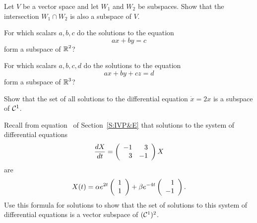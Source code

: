 \documentclass{ximera}
\begin{document}
\begin{exercise} \label{c5.1.6}
Let $V$ be a vector space and let $W_1$ and $W_2$ be subspaces.
Show that the intersection $W_1\cap W_2$ is also a subspace of $V$.
\end{exercise}

\begin{exercise} \label{c5.1.7a}
For which scalars $a,b,c$ do the solutions to the equation
\[
ax+by = c
\]
form a subspace of $\mbox{$\Bbb{R}$}^2$?
\end{exercise}
\begin{exercise} \label{c5.1.7b}
For which scalars $a,b,c,d$ do the solutions to the equation
\[
ax+by+cz = d
\]
form a subspace of $\mbox{$\Bbb{R}$}^3$?
\end{exercise}

\begin{exercise} \label{c5.1.8}
Show that the set of all solutions to the differential equation
$\dot{x}=2x$ is a subspace of ${\cal C}^1$.
\end{exercise}

\begin{exercise} \label{c5.1.9}
Recall from equation~ of Section~\ref{S:IVP&E}
that solutions to the system of differential equations
\[
\frac{dX}{dt} = \left(\begin{array}{rr} -1 & 3\\ 3 &-1\end{array}\right) X
\]
are
\[
X(t) = \alpha e^{2t}\left(\begin{array}{r} 1 \\ 1\end{array}\right) + \beta e^{-4t}\left(\begin{array}{r} 1 \\ -1\end{array}\right).
\]
Use this formula for solutions to show that the set of solutions
to this system of differential equations is a vector subspace of
$({\cal C}^1)^2$.
\end{exercise}
\end{document}
